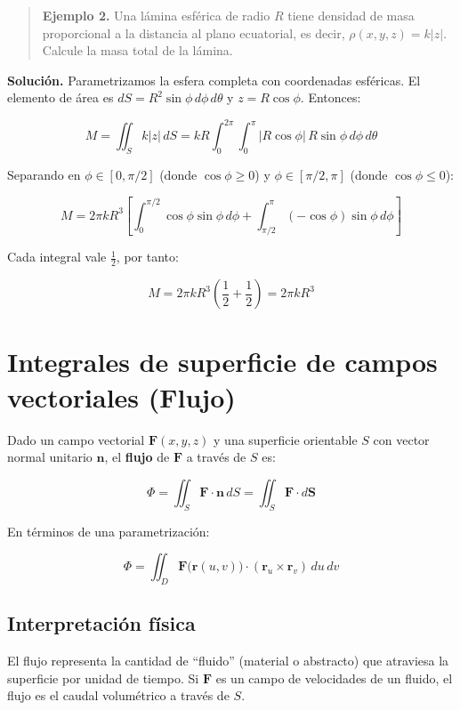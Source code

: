 \documentclass[
]{book}
\begin{document}
\begin{quote}
\textbf{Ejemplo 2.} Una lámina esférica de radio \(R\) tiene densidad de masa proporcional a la distancia al plano ecuatorial, es decir, \(\rho(x, y, z) = k|z|\). Calcule la masa total de la lámina.
\end{quote}

\textbf{Solución.} Parametrizamos la esfera completa con coordenadas esféricas. El elemento de área es \(dS = R^2\sin\phi \, d\phi\, d\theta\) y \(z = R\cos\phi\). Entonces:

\[
M = \iint_S k|z| \, dS = kR \int_0^{2\pi} \int_0^{\pi} |R\cos\phi| \, R\sin\phi \, d\phi\, d\theta
\]

Separando en \(\phi \in [0, \pi/2]\) (donde \(\cos\phi \geq 0\)) y \(\phi \in [\pi/2, \pi]\) (donde \(\cos\phi \leq 0\)):

\[
M = 2\pi k R^3 \left[ \int_0^{\pi/2} \cos\phi\sin\phi \, d\phi + \int_{\pi/2}^{\pi} (-\cos\phi)\sin\phi \, d\phi \right]
\]

Cada integral vale \(\frac{1}{2}\), por tanto:

\[
M = 2\pi k R^3 \left( \frac{1}{2} + \frac{1}{2} \right) = 2\pi k R^3
\]

\section{Integrales de superficie de campos vectoriales (Flujo)}\label{integrales-de-superficie-de-campos-vectoriales-flujo}

Dado un campo vectorial \(\mathbf{F}(x, y, z)\) y una superficie orientable \(S\) con vector normal unitario \(\mathbf{n}\), el \textbf{flujo} de \(\mathbf{F}\) a través de \(S\) es:

\[
\Phi = \iint_S \mathbf{F} \cdot \mathbf{n} \, dS = \iint_S \mathbf{F} \cdot d\mathbf{S}
\]

En términos de una parametrización:

\[
\Phi = \iint_D \mathbf{F}\bigl(\mathbf{r}(u, v)\bigr) \cdot (\mathbf{r}_u \times \mathbf{r}_v) \, du\, dv
\]

\subsection{Interpretación física}\label{interpretaciuxf3n-fuxedsica}

El flujo representa la cantidad de ``fluido'' (material o abstracto) que atraviesa la superficie por unidad de tiempo. Si \(\mathbf{F}\) es un campo de velocidades de un fluido, el flujo es el caudal volumétrico a través de \(S\).
\end{document}

